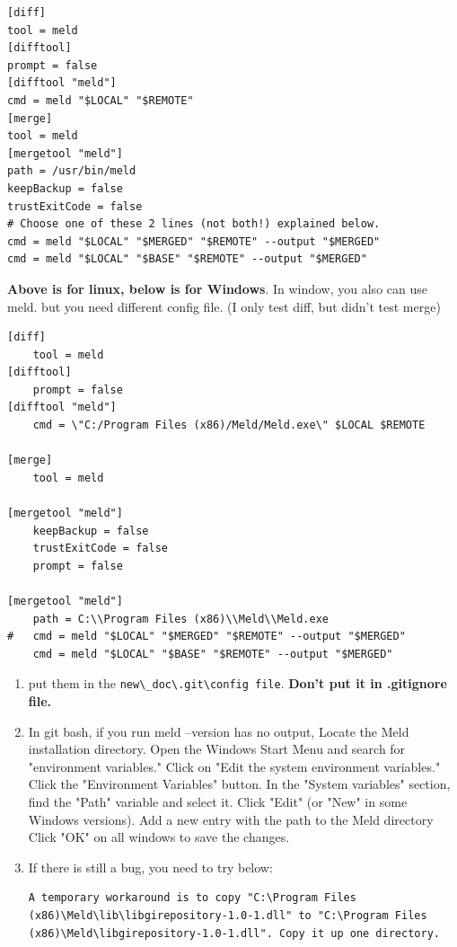 \documentclass[paper=8.5in:11in, twoside, 12pt, pagesize=pdftex]{book}
\begin{document}
\begin{lstlisting}
[diff]
tool = meld
[difftool]
prompt = false
[difftool "meld"]
cmd = meld "$LOCAL" "$REMOTE"
[merge]
tool = meld
[mergetool "meld"]
path = /usr/bin/meld
keepBackup = false
trustExitCode = false	
# Choose one of these 2 lines (not both!) explained below.
cmd = meld "$LOCAL" "$MERGED" "$REMOTE" --output "$MERGED"
cmd = meld "$LOCAL" "$BASE" "$REMOTE" --output "$MERGED"	
\end{lstlisting}
	
	\textbf{Above is for linux, below is for Windows}. In window, you also can use meld. but you need different config file. (I only test diff, but didn't test merge)
\begin{lstlisting}       
[diff]
	tool = meld
[difftool]
	prompt = false
[difftool "meld"]
	cmd = \"C:/Program Files (x86)/Meld/Meld.exe\" $LOCAL $REMOTE

[merge]
	tool = meld

[mergetool "meld"]
	keepBackup = false
	trustExitCode = false
	prompt = false

[mergetool "meld"]
	path = C:\\Program Files (x86)\\Meld\\Meld.exe
#	cmd = meld "$LOCAL" "$MERGED" "$REMOTE" --output "$MERGED"
	cmd = meld "$LOCAL" "$BASE" "$REMOTE" --output "$MERGED"		
\end{lstlisting}
	\begin{enumerate}
		\item put them in the \verb|new\_doc\.git\config file|. \textbf{Don't put it in .gitignore file.}
		
		\item In git bash, if you run meld --version has no output, Locate the Meld installation directory. Open the Windows Start Menu and search for "environment variables."
		Click on "Edit the system environment variables."
		Click the "Environment Variables" button.
		In the "System variables" section, find the "Path" variable and select it.
		Click "Edit" (or "New" in some Windows versions).
		Add a new entry with the path to the Meld directory 
		Click "OK" on all windows to save the changes.
		
		\item If there is still a bug, you need to try below:
\begin{lstlisting}       
A temporary workaround is to copy "C:\Program Files
(x86)\Meld\lib\libgirepository-1.0-1.dll" to "C:\Program Files (x86)\Meld\libgirepository-1.0-1.dll". Copy it up one directory.
\end{lstlisting}
		
	\end{enumerate}
	
\end{document}
